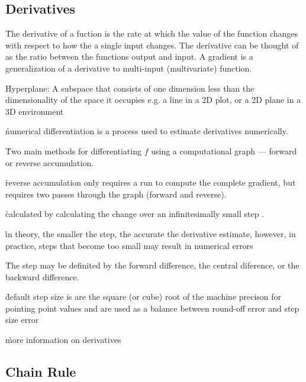 \subsection{Derivatives}

\r{The derivative of a fuction is the rate at which the value of the function changes with respect to how the a single input changes. The derivative can be thought of as the ratio between the functions output and input. A gradient is a generalization of a derivative to multi-input (multivariate) function.}



\r{Hyperplane: A subspace that consists of one dimension less than the dimensionality of the space it occupies e.g. a line in a 2D plot, or a 2D plane in a 3D environment}

\r{numerical differentiation is a process used to estimate derivatives numerically.}

\r{Two main methods for differentiating $f$ using a computational graph --- forward or reverse accumulation.}

\r{reverse accumulation\cite{linnainmaa1970representation} only requires a run to compute the complete gradient, but requires two passes through the graph (forward and reverse). }


\r{calculated by calculating the change over an infinitesimally small step .}

\r{in theory, the smaller the step, the accurate the derivative estimate, however, in practice, steps that become too small may result in numerical errors}

\r{The step may be definited by the forward difference, the central diference, or the backward difference. }

\r{default step size is are the square (or cube) root of the machine precison for pointing point values\cite{kochenderfer2019algorithms} and are used as a balance between round-off error and step size error }

\r{more information on derivatives\cite{griewank2008evaluating}}

\subsection{Chain Rule}


